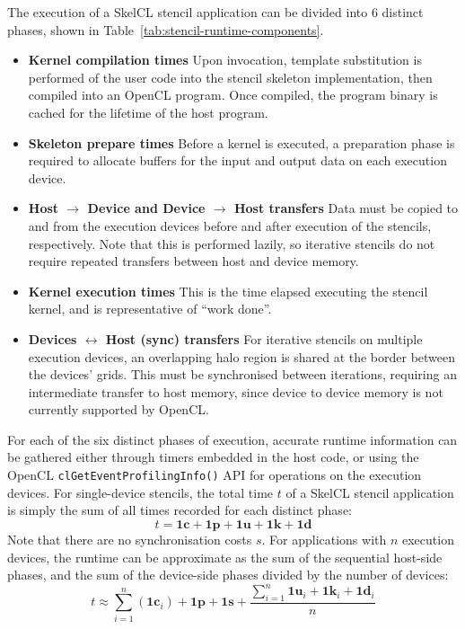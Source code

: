 The execution of a SkelCL stencil application can be divided into 6
distinct phases, shown in Table~\ref{tab:stencil-runtime-components}.
%
\begin{itemize}
\item \textbf{Kernel compilation times} Upon invocation, template
  substitution is performed of the user code into the stencil skeleton
  implementation, then compiled into an OpenCL program. Once compiled,
  the program binary is cached for the lifetime of the host program.
\item \textbf{Skeleton prepare times} Before a kernel is executed, a
  preparation phase is required to allocate buffers for the input and
  output data on each execution device.
\item \textbf{Host $\rightarrow$ Device and Device $\rightarrow$ Host
    transfers} Data must be copied to and from the execution devices
  before and after execution of the stencils, respectively. Note that
  this is performed lazily, so iterative stencils do not require
  repeated transfers between host and device memory.
\item \textbf{Kernel execution times} This is the time elapsed
  executing the stencil kernel, and is representative of ``work
  done''.
\item \textbf{Devices $\leftrightarrow$ Host (sync) transfers} For
  iterative stencils on multiple execution devices, an overlapping
  halo region is shared at the border between the devices' grids. This
  must be synchronised between iterations, requiring an intermediate
  transfer to host memory, since device to device memory is not
  currently supported by OpenCL.
\end{itemize}
%
For each of the six distinct phases of execution, accurate runtime
information can be gathered either through timers embedded in the host
code, or using the OpenCL \texttt{clGetEventProfilingInfo()} API for
operations on the execution devices. For single-device stencils, the
total time $t$ of a SkelCL stencil application is simply the sum of
all times recorded for each distinct phase:
%
\begin{equation}
t = \bm{1c} + \bm{1p} + \bm{1u} + \bm{1k} + \bm{1d}
\end{equation}
%
Note that there are no synchronisation costs $s$. For applications
with $n$ execution devices, the runtime can be approximate as the sum
of the sequential host-side phases, and the sum of the device-side
phases divided by the number of devices:
%
\begin{equation}
t \approx \sum_{i=1}^n{(\bm{1c}_{i})} + \bm{1p} + \bm{1s} +
  \frac{\sum_{i=1}^n{\bm{1u}_{i} + \bm{1k}_{i} + \bm{1d}_{i}}}{n}
\end{equation}
